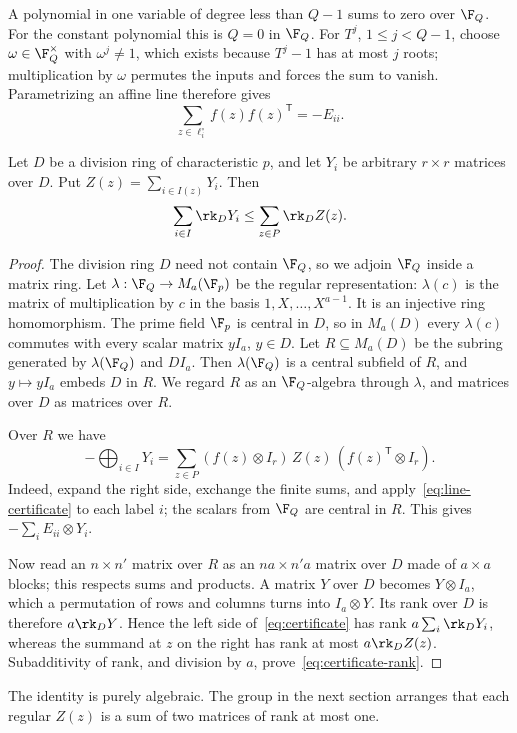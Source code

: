 A polynomial in one variable of degree less than \(Q-1\) sums to zero
over \(\F_Q\). For the constant polynomial this is \(Q=0\) in \(\F_Q\).
For \(T^j\), \(1\le j<Q-1\), choose
\(\omega\in\F_Q^\times\) with \(\omega^j\ne1\), which exists because
\(T^j-1\) has at most \(j\) roots; multiplication by \(\omega\)
permutes the inputs and forces the sum to vanish.
Parametrizing an affine line therefore gives
\begin{equation}\label{eq:line-certificate}
 \sum_{z\in\ell_i^\circ}f(z)f(z)^{\mathsf T}=-E_{ii}.
\end{equation}

\begin{lemma}\label{lem:certificate}
Let \(D\) be a division ring of characteristic \(p\), and let \(Y_i\)
be arbitrary \(r\times r\) matrices over \(D\). Put
\(Z(z)=\sum_{i\in I(z)}Y_i\). Then
\begin{equation}\label{eq:certificate-rank}
 \sum_{i\in I}\rk_D Y_i\le\sum_{z\in P}\rk_D Z(z).
\end{equation}
\end{lemma}

\begin{proof}
The division ring \(D\) need not contain \(\F_Q\), so we adjoin
\(\F_Q\) inside a matrix ring. Let \(\lambda:\F_Q\to M_a(\F_p)\) be
the regular representation: \(\lambda(c)\) is the matrix of
multiplication by \(c\) in the basis \(1,X,\ldots,X^{a-1}\). It is an
injective ring homomorphism. The prime field \(\F_p\) is central in
\(D\), so in \(M_a(D)\) every \(\lambda(c)\) commutes with every
scalar matrix \(yI_a\), \(y\in D\). Let \(R\subseteq M_a(D)\) be the
subring generated by \(\lambda(\F_Q)\) and \(DI_a\). Then
\(\lambda(\F_Q)\) is a central subfield of \(R\), and
\(y\mapsto yI_a\) embeds \(D\) in \(R\). We regard \(R\) as an
\(\F_Q\)-algebra through \(\lambda\), and matrices over \(D\) as
matrices over \(R\).

Over \(R\) we have
\begin{equation}\label{eq:certificate}
 -\bigoplus_{i\in I}Y_i
 =\sum_{z\in P}(f(z)\otimes I_r)\,Z(z)\,
                 (f(z)^{\mathsf T}\otimes I_r).
\end{equation}
Indeed, expand the right side, exchange the finite sums, and
apply~\eqref{eq:line-certificate} to each label \(i\); the scalars
from \(\F_Q\) are central in \(R\).
This gives \(-\sum_i E_{ii}\otimes Y_i\).

Now read an \(n\times n'\) matrix over \(R\) as an \(na\times n'a\)
matrix over \(D\) made of \(a\times a\) blocks; this respects sums
and products. A matrix \(Y\) over \(D\) becomes \(Y\otimes I_a\),
which a permutation of rows and columns turns into
\(I_a\otimes Y\). Its rank over \(D\) is therefore \(a\rk_D Y\).
Hence the left side of~\eqref{eq:certificate} has rank
\(a\sum_i\rk_D Y_i\), whereas the summand at \(z\) on the right has
rank at most \(a\rk_D Z(z)\). Subadditivity of rank, and division
by \(a\), prove~\eqref{eq:certificate-rank}.
\end{proof}

The identity is purely algebraic. The group in the next section
arranges that each regular \(Z(z)\) is a sum of two matrices of rank
at most one.

